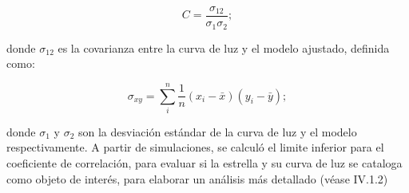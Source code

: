 \begin{equation}
\displaystyle C=\frac{\sigma_{12}}{\sigma_{1}\sigma_{2}};
\end{equation}
  
donde $\sigma_{12}$ es la covarianza entre la curva de luz y el modelo ajustado, definida como:
  
\begin{equation}
\displaystyle \sigma_{xy}= \sum\limits_{i}^{n} \frac{1}{n}(x_{i}-\bar{x})(y_{i}-\bar{y});
\end{equation}
  
donde $\sigma_{1}$ y $\sigma_{2}$ son la desviación estándar de la curva de luz y el modelo respectivamente. A partir de simulaciones, se calculó el limite inferior para el coeficiente de correlación, para evaluar si la estrella y su curva de luz se cataloga como objeto de interés, para elaborar un análisis más detallado (véase IV.1.2)














